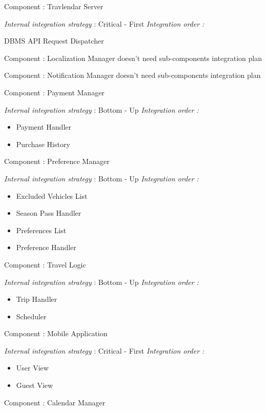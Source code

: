 Component : Travlendar Server

\textit{Internal integration strategy} : Critical - First
\textit{Integration order :}
	\begin{itemize}
		\itemize DBMS
		\itemize API Request Dispatcher
	\end{itemize}
	
Component : Localization Manager doesn't need sub-components integration plan

Component : Notification Manager doesn't need sub-components integration plan
	

Component : Payment Manager

\textit{Internal integration strategy} : Bottom - Up
\textit{Integration order :}
	\begin{itemize}
		\item Payment Handler
		\item Purchase History
	\end{itemize}
	
Component : Preference Manager

\textit{Internal integration strategy} : Bottom - Up
\textit{Integration order :}
	\begin{itemize}
	
		\item Excluded Vehicles List
		\item Season Pass Handler
		\item Preferences List
		\item Preference Handler
		
	\end{itemize}
	
Component : Travel Logic

\textit{Internal integration strategy} : Bottom - Up
\textit{Integration order :}
	\begin{itemize}	
		\item Trip Handler
		\item Scheduler
	\end{itemize}
	
Component : Mobile Application

\textit{Internal integration strategy} : Critical - First
\textit{Integration order :}
	\begin{itemize}
		\item User View
		\item Guest View
	\end{itemize}
	
Component : Calendar Manager

